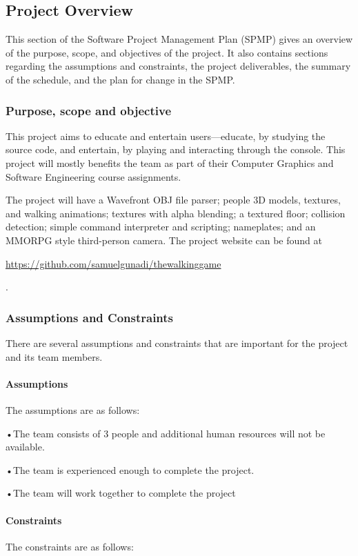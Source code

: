 \documentclass[12pt,letterpaper]{article}
\begin{document}
	\subsection{Project Overview}
	This section of the Software Project Management Plan (SPMP) gives an overview of the purpose, scope, and objectives of the project. It also contains sections regarding the assumptions and constraints, the project deliverables, the summary of the schedule, and the plan for change in the SPMP.
	
	\subsubsection{Purpose, scope and objective}
	This project aims to educate and entertain users---educate, by studying the source code, and entertain, by playing and interacting through the console. This project will mostly benefits the team as part of their Computer Graphics and Software Engineering course assignments.
	
	The project will have a Wavefront OBJ file parser; people 3D models, textures, and walking animations; textures with alpha blending; a textured floor; collision detection; simple command interpreter and scripting; nameplates; and an MMORPG style third-person camera. The project website can be found at \begin{footnotesize}\url{https://github.com/samuelgunadi/thewalkinggame}\end{footnotesize}.
	
	\subsubsection{Assumptions and Constraints}
	There are several assumptions and constraints that are important for the project and its team members.
	
	\paragraph{Assumptions}
	The assumptions are as follows:
	
	•\enspace The team consists of 3 people and additional human resources will not be available.
	
	•\enspace The team is experienced enough to complete the project.
	
	•\enspace The team will work together to complete the project
	
	
	\paragraph{Constraints}
	The constraints are as follows:
	
\end{document}
